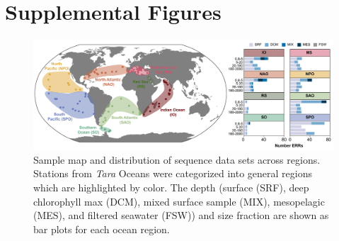 \documentclass[12pt]{article}
\numberwithin{equation}{section}
\begin{document}
\section*{Supplemental Figures}

\begin{landscape}
\begin{figure}
    \centering
    \includegraphics[width=0.95\columnwidth]{si-figures/Tara_stationMap-01.png}
    \caption{Sample map and distribution of sequence data sets across regions. Stations from \textit{Tara} Oceans were categorized into general regions which are highlighted by color. The depth (surface (SRF), deep chlorophyll max (DCM), mixed surface sample (MIX), mesopelagic (MES), and filtered seawater (FSW)) and size fraction are shown as bar plots for each ocean region. }
    \label{fig:tara-map}
\end{figure}
\end{landscape}
\end{document}
